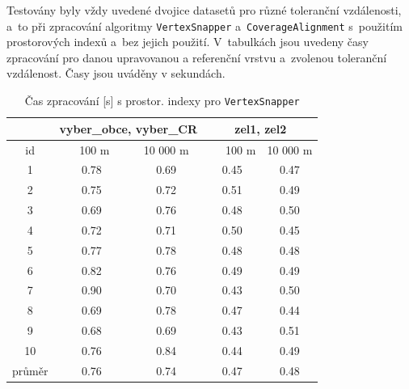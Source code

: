 Testovány byly vždy uvedené dvojice datasetů pro různé toleranční vzdálenosti,
a~to při zpracování algoritmy \texttt{Vertex\-Snapper} a~\texttt{Coverage\-Alignment}
s~použitím prostorových indexů a~bez jejich použití. V~tabulkách jsou uvedeny 
časy zpracování pro danou upravovanou a referenční vrstvu a~zvolenou toleranční 
vzdálenost. Časy jsou uváděny v sekundách.

\begin{table}
\centering
 \begin{tabular}{|c|c|c|c|c|}
  \hline
     & \multicolumn{2}{c|}{vyber\_obce, vyber\_CR} & 
	\multicolumn{2}{c|}{zel1, zel2} \\
  \hline
   id  &  ~~100 m~ & 10 000 m & ~~~100 m & 10 000 m\\
  \hline
  \hline
  1  &0.78 & 0.69 &  0.45 & 0.47 \\
  2  &0.75 & 0.72 &  0.51 & 0.49 \\
  3  &0.69 & 0.76 &  0.48 & 0.50 \\
  4  &0.72 & 0.71 &  0.50 & 0.45 \\
  5  &0.77 & 0.78 &  0.48 & 0.48 \\
  6  &0.82 & 0.76 &  0.49 & 0.49 \\
  7  &0.90 & 0.70 &  0.43 & 0.50 \\
  8  &0.69 & 0.78 &  0.47 & 0.44 \\
  9  &0.68 & 0.69 &  0.43 & 0.51 \\
  10 &0.76 & 0.84 &  0.44 & 0.49 \\
  \hline
  \hline
  průměr & 0.76 & 0.74 &0.47 &0.48\\
  \hline
 \end{tabular}
  \caption{ Čas zpracování [s] s prostor. indexy pro 
	    \texttt{Vertex\-Snapper}}
  \label{tab:vs-s}
\end{table}

